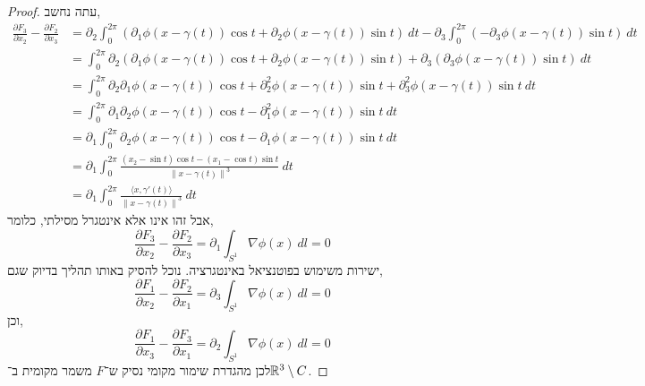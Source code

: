 \begin{proof}
	עתה נחשב,
	\begin{align*}
		\frac{\partial F_3}{\partial x_2} - \frac{\partial F_2}{\partial x_3}
		& = \partial_2 \int_{0}^{2 \pi} (\partial_1 \phi(x - \gamma(t)) \cos t + \partial_2 \phi(x - \gamma(t)) \sin t)\ dt - \partial_3 \int_{0}^{2 \pi} (- \partial_3 \phi(x - \gamma(t)) \sin t)\ dt \\
		& = \int_{0}^{2 \pi} \partial_2 (\partial_1 \phi(x - \gamma(t)) \cos t + \partial_2 \phi(x - \gamma(t)) \sin t) + \partial_3 (\partial_3 \phi(x - \gamma(t)) \sin t)\ dt \\
		& = \int_{0}^{2 \pi} \partial_2 \partial_1 \phi(x - \gamma(t)) \cos t + \partial_2^2 \phi(x - \gamma(t)) \sin t + \partial_3^2 \phi(x - \gamma(t)) \sin t\ dt \\
		& = \int_{0}^{2 \pi} \partial_1 \partial_2 \phi(x - \gamma(t)) \cos t - \partial_1^2 \phi(x - \gamma(t)) \sin t\ dt \\
		& = \partial_1 \int_{0}^{2 \pi} \partial_2 \phi(x - \gamma(t)) \cos t - \partial_1 \phi(x - \gamma(t)) \sin t\ dt \\
		& = \partial_1 \int_{0}^{2 \pi} \frac{(x_2 - \sin t) \cos t - (x_1 - \cos t) \sin t}{{\lVert x - \gamma(t) \rVert}^3}\ dt \\
		& = \partial_1 \int_{0}^{2 \pi} \frac{\langle x, \gamma'(t) \rangle}{{\lVert x - \gamma(t) \rVert}^3}\ dt
	\end{align*}
	אבל זהו אינו אלא אינטגרל מסילתי, כלומר,
	\[
		\frac{\partial F_3}{\partial x_2} - \frac{\partial F_2}{\partial x_3}
		= \partial_1 \int_{S^1} \nabla \phi(x)\ dl
		= 0
	\]
	ישירות משימוש בפוטנציאל באינטגרציה.
	נוכל להסיק באותו תהליך בדיוק שגם,
	\[
		\frac{\partial F_1}{\partial x_2} - \frac{\partial F_2}{\partial x_1}
		= \partial_3 \int_{S^1} \nabla \phi(x)\ dl
		= 0
	\]
	וכן,
	\[
		\frac{\partial F_1}{\partial x_3} - \frac{\partial F_3}{\partial x_1}
		= \partial_2 \int_{S^1} \nabla \phi(x)\ dl
		= 0
	\]
	לכן מהגדרת שימור מקומי נסיק ש־$F$ משמר מקומית ב־$\mathbb{R}^3 \setminus C$.
\end{proof}

